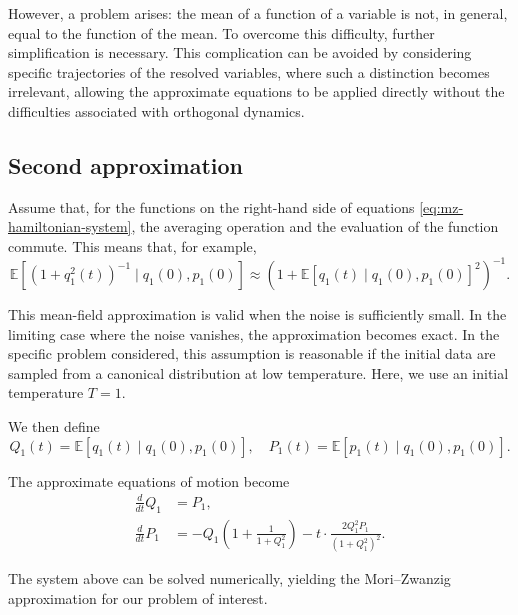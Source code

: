 \documentclass[12pt]{article}
\begin{document}
However, a problem arises: the mean of a function of a variable is not, in general, equal to the function of the mean. To overcome this difficulty, further simplification is necessary. This complication can be avoided by considering specific trajectories of the resolved variables, where such a distinction becomes irrelevant, allowing the approximate equations to be applied directly without the difficulties associated with orthogonal dynamics.


\subsection{Second approximation}

Assume that, for the functions on the right-hand side of equations \eqref{eq:mz-hamiltonian-system}, the averaging operation and the evaluation of the function commute. This means that, for example,
\begin{equation*}
	\mathbb{E}\!\left[(1 + q_1^2(t))^{-1} \mid q_1(0), p_1(0)\right] 
	\approx \left(1 + \mathbb{E}[q_1(t) \mid q_1(0), p_1(0)]^2\right)^{-1}.
\end{equation*}

This mean-field approximation is valid when the noise is sufficiently small. In the limiting case where the noise vanishes, the approximation becomes exact. In the specific problem considered, this assumption is reasonable if the initial data are sampled from a canonical distribution at low temperature. Here, we use an initial temperature $T = 1$.

We then define
\begin{equation*}
	Q_1(t) = \mathbb{E}[q_1(t) \mid q_1(0), p_1(0)], 
	\quad 
	P_1(t) = \mathbb{E}[p_1(t) \mid q_1(0), p_1(0)].
\end{equation*}

The approximate equations of motion become
\begin{align*}
	\frac{d}{dt} Q_1 & = P_1,                                     \\
	\frac{d}{dt} P_1 & = -Q_1\left(1 + \frac{1}{1 + Q_1^2}\right) 
	- t \cdot \frac{2 Q_1^2 P_1}{(1 + Q_1^2)^2}.
\end{align*}

The system above can be solved numerically, yielding the Mori–Zwanzig approximation for our problem of interest.
\newpage
\nocite{*}
\printbibliography
\end{document}
